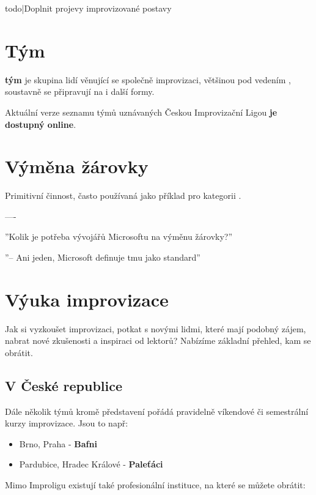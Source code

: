 \documentclass[main.tex]{subfiles}
\begin{document}
{{todo|Doplnit projevy improvizované postavy}} 
\needspace{5cm} \section{Tým} \label{tým}  \textbf{tým}{} je skupina lidí věnující se společně improvizaci, většinou pod vedením , soustavně se připravují na  i další formy. 
 
Aktuální verze seznamu týmů uznávaných  Českou Improvizační Ligou  \textbf{je dostupný online}. 
\needspace{5cm} \section{Výměna žárovky} \label{výměna žárovky} Primitivní činnost, často používaná jako příklad pro kategorii . 
 
 
---- 
 
 
''Kolik je potřeba vývojářů Microsoftu na výměnu žárovky?'' 
 
''-- Ani jeden, Microsoft definuje tmu jako standard'' 
\needspace{5cm} \section{Výuka improvizace} \label{výuka improvizace} Jak si vyzkoušet improvizaci, potkat s novými lidmi, které mají podobný zájem, nabrat nové zkušenosti a inspiraci od lektorů? Nabízíme základní přehled, kam se obrátit. 
 
\subsection{ V České republice }  
Dále několik  týmů kromě představení pořádá pravidelně víkendové či semestrální kurzy improvizace. 
Jsou to např: 
\begin{itemize}
\item  Brno, Praha - \textbf{Bafni}
\item  Pardubice, Hradec Králové - \textbf{Paleťáci}
\end{itemize}
 
Mimo Improligu existují také profesionální instituce, na které se můžete obrátit: 
 
\end{document}
